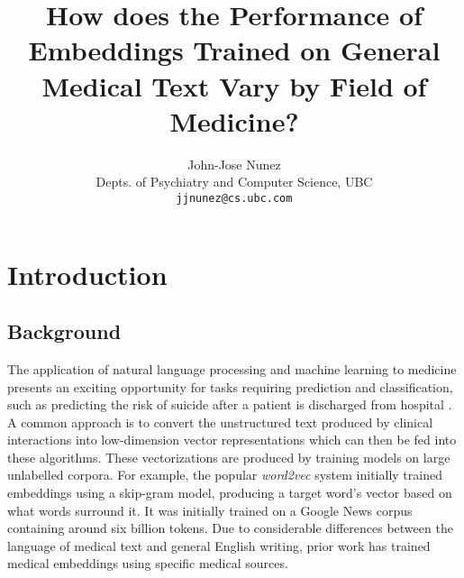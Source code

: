 \documentclass[10pt]{article}
\title{How does the Performance of Embeddings Trained on General Medical Text Vary by Field of Medicine?}
\author{John-Jose Nunez\\
  Depts. of Psychiatry and Computer Science, UBC\\
  {\tt jjnunez@cs.ubc.com} 
}
\date{}
\begin{document}
\maketitle

\section{Introduction}

\subsection{Background}



The application of natural language processing and machine learning to medicine presents an exciting opportunity for tasks requiring prediction and classification, such as predicting the risk of suicide after a patient is discharged from hospital \cite{mccoyImprovingPredictionSuicide2016}. A common approach is to convert the unstructured text produced by clinical interactions into low-dimension vector representations which can then be fed into these algorithms. These vectorizations are produced by training models on large unlabelled corpora. For example, the popular \emph{word2vec} system \cite{mikolovEfficientEstimationWord2013} initially trained embeddings using a skip-gram model, producing a target word's vector based on what words surround it. It was initially trained on a Google News corpus containing around six billion tokens. Due to considerable differences between the language of medical text and general English writing, prior work has trained medical embeddings using specific medical sources. 
\end{document}
